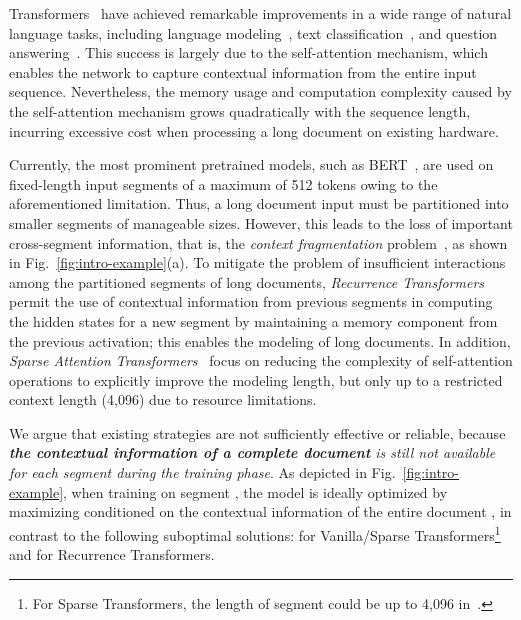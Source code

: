 \documentclass[11pt,a4paper]{article}
\begin{document}
Transformers~\citep{vaswani2017attention} have achieved remarkable improvements in a wide range of natural language tasks, including language modeling~\citep{transformer_xl}, text classification~\citep{yang2019xlnet}, and question answering~\citep{devlin2018bert, radford2019language}. This success is largely due to the self-attention mechanism, which enables the network to capture contextual information from the entire input sequence. Nevertheless, the memory usage and computation complexity caused by the self-attention mechanism grows quadratically with the sequence length, incurring excessive cost when processing a long document on existing hardware.

Currently, the most prominent pretrained models, such as BERT~\citep{devlin2018bert}, are used on fixed-length input segments of a maximum of 512 tokens owing to the aforementioned limitation. Thus, a long document input must be partitioned into smaller segments of manageable sizes. However, this leads to the loss of important cross-segment information, that is, the \textit{context fragmentation} problem~\citep{transformer_xl}, as shown in Fig.~\ref{fig:intro-example}(a). To mitigate the problem of insufficient interactions among the partitioned segments of long documents, \textit{Recurrence Transformers}~\citep{transformer_xl, compressive_transformer} permit the use of contextual information from previous segments in computing the hidden states for a new segment by maintaining a memory component from the previous activation; this enables the modeling of long documents. In addition, \textit{Sparse Attention Transformers}~\citep{sparse_transformer,tay2020sparse,beltagy2020longformer,zaheer2020big} focus on reducing the complexity of self-attention operations to explicitly improve the modeling length, but only up to a restricted context length (4,096) due to resource limitations. 

We argue that existing strategies are not sufficiently effective or reliable, because \textit{\textbf{the contextual information of a complete document} is still not available for each segment during the training phase}. As depicted in Fig.~\ref{fig:intro-example}, when training on segment , the model is ideally optimized by maximizing  conditioned on the contextual information of the entire document , in contrast to the following suboptimal solutions:  for Vanilla/Sparse Transformers\footnote{For Sparse Transformers, the length of segment  could be up to 4,096 in~\citet{beltagy2020longformer,zaheer2020big}.} and  for Recurrence Transformers.
\end{document}

